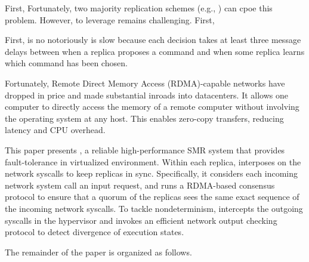 First, 
Fortunately, two majority replication schemes (e.g., \paxos) can cpoe this problem. However, to 
leverage \paxos remains challenging. First, 





First, \paxos is no notoriously is slow because each decision takes at least three message delays 
between when a replica proposes a command and when some replica learns which command has been chosen.

Fortunately, Remote Direct Memory Access (RDMA)-capable networks have dropped in price and made 
substantial inroads into datacenters. It allows one computer to directly access the memory of 
a remote computer without involving the operating system at any host. This enables zero-copy 
transfers, reducing latency and CPU overhead.

This paper presents \xxx, a reliable high-performance SMR system that provides fault-tolerance 
in virtualized environment. Within each replica, \xxx interposes on the network syscalls to keep 
replicas in sync. Specifically, it considers each incoming network system call  an input request, 
and runs a RDMA-based \paxos consensus protocol to ensure that a quorum of the replicas sees the 
same exact sequence of the incoming network syscalls. To tackle nondeterminism, \xxx intercepts 
the outgoing syscalls in the hypervisor and invokes an efficient network output checking protocol 
to detect divergence of execution states.

The remainder of the paper is organized as follows.
